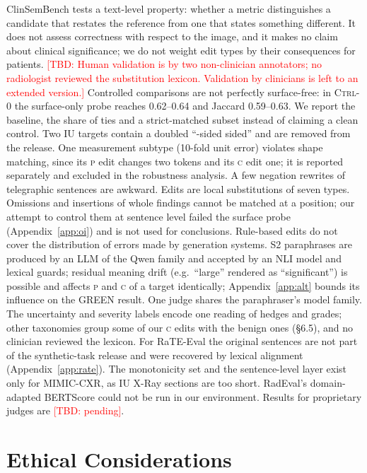 \documentclass[11pt]{article}
\newcommand{\bench}{ClinSemBench\xspace}
\newcommand{\Pc}{\textsc{p}\xspace}
\newcommand{\Cc}{\textsc{c}\xspace}
\newcommand{\ctrlz}{\textsc{Ctrl-0}\xspace}
\newcommand{\tbd}[1]{\textcolor{red}{[TBD: #1]}}
\begin{document}
\bench tests a text-level property: whether a metric distinguishes a candidate that restates the reference from one that states something different. It does not assess correctness with respect to the image, and it makes no claim about clinical significance; we do not weight edit types by their consequences for patients. \tbd{Human validation is by two non-clinician annotators; no radiologist reviewed the substitution lexicon. Validation by clinicians is left to an extended version.}
Controlled comparisons are not perfectly surface-free: in \ctrlz the surface-only probe reaches 0.62--0.64 and Jaccard 0.59--0.63. We report the baseline, the share of ties and a strict-matched subset instead of claiming a clean control. Two IU targets contain a doubled ``-sided sided'' and are removed from the release. One measurement subtype (10-fold unit error) violates shape matching, since its \Pc edit changes two tokens and its \Cc edit one; it is reported separately and excluded in the robustness analysis. A few negation rewrites of telegraphic sentences are awkward.
Edits are local substitutions of seven types. Omissions and insertions of whole findings cannot be matched at a position; our attempt to control them at sentence level failed the surface probe (Appendix~\ref{app:oi}) and is not used for conclusions. Rule-based edits do not cover the distribution of errors made by generation systems.
S2 paraphrases are produced by an LLM of the Qwen family and accepted by an NLI model and lexical guards; residual meaning drift (e.g.\ ``large'' rendered as ``significant'') is possible and affects \Pc and \Cc of a target identically; Appendix~\ref{app:alt} bounds its influence on the GREEN result. One judge shares the paraphraser's model family.
The uncertainty and severity labels encode one reading of hedges and grades; other taxonomies group some of our \Cc edits with the benign ones (\S6.5), and no clinician reviewed the lexicon. For RaTE-Eval the original sentences are not part of the synthetic-task release and were recovered by lexical alignment (Appendix~\ref{app:rate}).
The monotonicity set and the sentence-level layer exist only for MIMIC-CXR, as IU X-Ray sections are too short. RadEval's domain-adapted BERTScore could not be run in our environment. Results for proprietary judges are \tbd{pending}.

\section*{Ethical Considerations}
\end{document}
